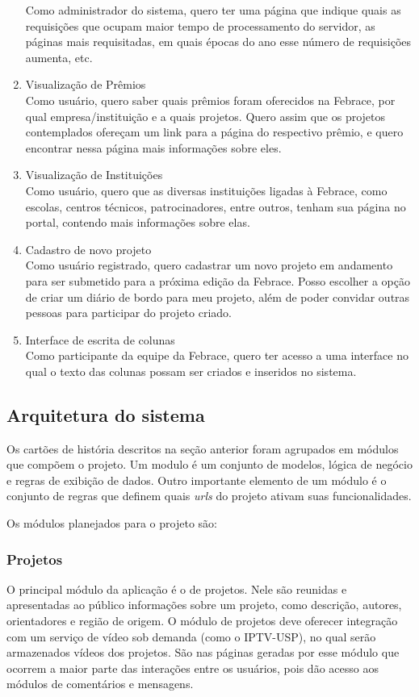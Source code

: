 \begin{enumerate}
        Como administrador do sistema, quero ter uma página que indique quais as requisições que ocupam maior tempo de processamento do servidor, as páginas mais requisitadas, em quais épocas do ano esse número de requisições aumenta, etc.
      \item Visualização de Prêmios \\
        Como usuário, quero saber quais prêmios foram oferecidos na Febrace, por qual empresa/instituição e a quais projetos. Quero assim que os projetos contemplados ofereçam um link para a página do respectivo prêmio, e quero encontrar nessa página mais informações sobre eles.
      \item Visualização de Instituições \\
        Como usuário, quero que as diversas instituições ligadas à Febrace, como escolas, centros técnicos, patrocinadores, entre outros, tenham sua página no portal, contendo mais informações sobre elas.
      \item Cadastro de novo projeto \\
        Como usuário registrado, quero cadastrar um novo projeto em andamento para ser submetido para a próxima edição da Febrace. Posso escolher a opção de criar um diário de bordo para meu projeto, além de poder convidar outras pessoas para participar do projeto criado.
      \item Interface de escrita de colunas \\
        Como participante da equipe da Febrace, quero ter acesso a uma interface no qual o texto das colunas possam ser criados e inseridos no sistema.
    \end{enumerate}

  \subsection{Arquitetura do sistema}

    Os cartões de história descritos na seção anterior foram agrupados em módulos que compõem o projeto. Um modulo é um conjunto de modelos, lógica de negócio e regras de exibição de dados. Outro importante elemento de um módulo é o conjunto de regras que definem quais \textit{urls} do projeto ativam suas funcionalidades.

    Os módulos planejados para o projeto são:

    \subsubsection{Projetos}
      O principal módulo da aplicação é o de projetos. Nele são reunidas e apresentadas ao público informações sobre um projeto, como descrição, autores, orientadores e região de origem. O módulo de projetos deve oferecer integração com um serviço de vídeo sob demanda (como o IPTV-USP), no qual serão armazenados vídeos dos projetos. São nas páginas geradas por esse módulo que ocorrem a maior parte das interações entre os usuários, pois dão acesso aos módulos de comentários e mensagens.

